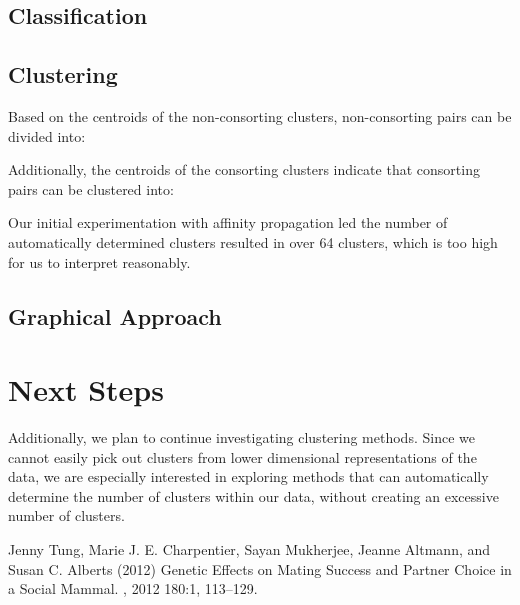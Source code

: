 \documentclass[twoside,twocolumn,paper=letter]{article}
\begin{document}
\subsection{Classification}
\subsection{Clustering}

Based on the centroids of the non-consorting clusters, non-consorting pairs can
be divided into:
\begin{itemize}
\end{itemize}
Additionally, the centroids of the consorting clusters indicate that consorting
pairs can be clustered into:
\begin{itemize}
\end{itemize}

Our initial experimentation with affinity propagation led the number of
automatically determined clusters resulted in over 64 clusters, which is too
high for us to interpret reasonably.

\subsection{Graphical Approach}


\section{Next Steps}
Additionally, we plan to continue investigating clustering methods. Since we
cannot easily pick out clusters from lower dimensional representations of the
data, we are especially interested in exploring methods that can automatically
determine the number of clusters within our data, without creating an excessive
number of clusters.


\begin{thebibliography}{99} %

  Jenny Tung, Marie J. E. Charpentier, Sayan Mukherjee, Jeanne Altmann, and Susan C. Alberts (2012)
\newblock 
  Genetic Effects on Mating Success and Partner Choice in a Social Mammal.
, 2012 180:1, 113--129.
 
\end{thebibliography}

\end{document}
